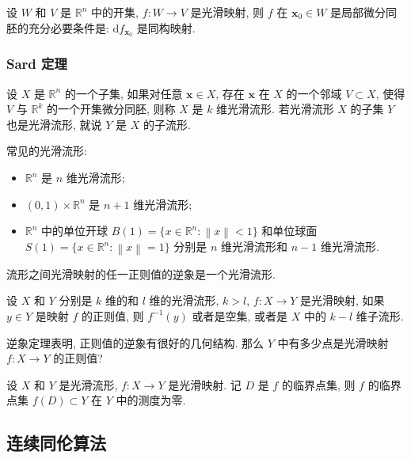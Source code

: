 \begin{corollary}
  设 \(W\) 和 \(V\) 是 \(\mathbb{R}^n\) 中的开集, \(f:W\to V\) 是光滑映射, 则 \(f\) 在 \(\boldsymbol{x}_0\in W\) 是局部微分同胚的充分必要条件是: \(\mathrm{d}f_{\boldsymbol{x}_0}\) 是同构映射.
\end{corollary}

\subsubsection{Sard 定理}

\begin{definition}
  设 \(X\) 是 \(\mathbb{R}^n\) 的一个子集, 如果对任意 \(\boldsymbol{x}\in X\), 存在 \(\boldsymbol{x}\) 在 \(X\) 的一个邻域 \(V\subset X\), 使得 \(V\) 与 \(\mathbb{R}^k\) 的一个开集微分同胚, 则称 \(X\) 是 \(k\) 维光滑流形. 若光滑流形 \(X\) 的子集 \(Y\) 也是光滑流形, 就说 \(Y\) 是 \(X\) 的子流形.
\end{definition}

常见的光滑流形:
\begin{itemize}
  \item \(\mathbb{R}^n\) 是 \(n\) 维光滑流形;
  \item \((0,1)\times\mathbb{R}^n\) 是 \(n+1\) 维光滑流形;
  \item \(\mathbb{R}^n\) 中的单位开球 \(B(1)=\lbrace x\in\mathbb{R}^n: \left\lVert x\right\rVert < 1\rbrace\) 和单位球面 \(S(1)=\lbrace x\in\mathbb{R}^n: \left\lVert x\right\rVert =1\rbrace\) 分别是 \(n\) 维光滑流形和 \(n-1\) 维光滑流形.
\end{itemize}

流形之间光滑映射的任一正则值的逆象是一个光滑流形.

\begin{theorem}[逆象定理]
  设 \(X\) 和 \(Y\) 分别是 \(k\) 维的和 \(l\) 维的光滑流形, \(k>l\), \(f:X\to Y\) 是光滑映射, 如果 \(y\in Y\) 是映射 \(f\) 的正则值, 则 \(f^{-1}(y)\) 或者是空集, 或者是 \(X\) 中的 \(k-l\) 维子流形.
\end{theorem}

逆象定理表明, 正则值的逆象有很好的几何结构. 那么 \(Y\) 中有多少点是光滑映射 \(f:X\to Y\) 的正则值?

\begin{theorem}[Sard 定理]
  设 \(X\) 和 \(Y\) 是光滑流形, \(f:X\to Y\) 是光滑映射. 记 \(D\) 是 \(f\) 的临界点集, 则 \(f\) 的临界点集 \(f(D)\subset Y\) 在 \(Y\) 中的测度为零.
\end{theorem}

\subsection{连续同伦算法}

